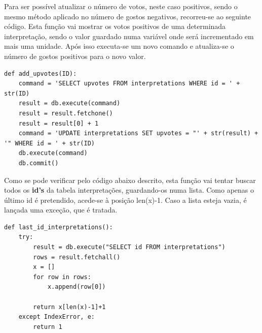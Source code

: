 Para ser possível atualizar o número de votos, neste caso positivos, sendo o mesmo método aplicado no número de gostos negativos, recorreu-se ao seguinte código. Esta função vai mostrar os votos positivos de uma determinada interpretação, sendo o valor guardado numa variável onde será incrementado em mais uma unidade. Após isso executa-se um novo comando e atualiza-se o número de gostos positivos para o novo valor.  

\begin{lstlisting}
def add_upvotes(ID):
	command = 'SELECT upvotes FROM interpretations WHERE id = ' + str(ID)
	result = db.execute(command)
	result = result.fetchone()
	result = result[0] + 1
	command = 'UPDATE interpretations SET upvotes = "' + str(result) + '" WHERE id = ' + str(ID)
	db.execute(command)
	db.commit()

\end{lstlisting}

Como se pode verificar pelo código abaixo descrito, esta função vai tentar buscar todos os \textbf{id's} da tabela interpretações, guardando-os numa lista. Como apenas o último id é pretendido, acede-se à posição len(x)-1. Caso a lista esteja vazia, é lançada uma exceção, que é tratada. 

\begin{lstlisting}
def last_id_interpretations():
	try:
		result = db.execute("SELECT id FROM interpretations")
		rows = result.fetchall()
		x = []
		for row in rows:
			x.append(row[0])

		return x[len(x)-1]+1
	except IndexError, e:
		return 1

\end{lstlisting}